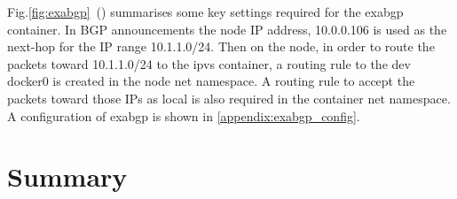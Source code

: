 Fig.\ref{fig:exabgp}~() summarises some key settings required for the exabgp container.
In BGP announcements the node IP address, 10.0.0.106 is used as the next-hop for the IP range 10.1.1.0/24.
Then on the node, in order to route the packets toward 10.1.1.0/24 to the ipvs container, 
a routing rule to the dev docker0 is created in the node net namespace. 
A routing rule to accept the packets toward those IPs as local is also required in the container net namespace. 
A configuration of exabgp is shown in \ref{appendix:exabgp_config}.


\FloatBarrier




\section{Summary}
